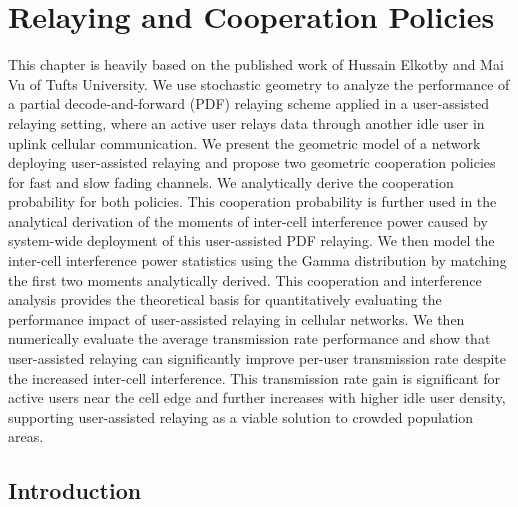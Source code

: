 \chapter{Relaying and Cooperation Policies}
This chapter is heavily based on the published work\cite{elk} of Hussain Elkotby and Mai Vu of Tufts University. 
We use stochastic geometry to analyze the performance of a partial decode-and-forward (PDF) relaying scheme applied in a user-assisted relaying setting, where an active user relays data through another idle user in uplink cellular communication. We present the geometric model of a network deploying user-assisted relaying and propose two geometric cooperation policies for fast and slow fading channels. We analytically derive the cooperation probability for both policies. This cooperation
probability is further used in the analytical derivation of the
moments of inter-cell interference power caused by system-wide
deployment of this user-assisted PDF relaying. We then model the
inter-cell interference power statistics using the Gamma distribution by matching the first two moments analytically derived. This
cooperation and interference analysis provides the theoretical
basis for quantitatively evaluating the performance impact of
user-assisted relaying in cellular networks. We then numerically
evaluate the average transmission rate performance and show
that user-assisted relaying can significantly improve per-user
transmission rate despite the increased inter-cell interference. This
transmission rate gain is significant for active users near the
cell edge and further increases with higher idle user density,
supporting user-assisted relaying as a viable solution to crowded
population areas.

\section{Introduction}

